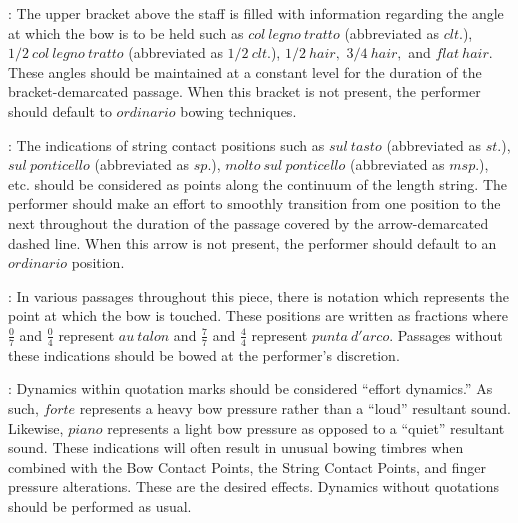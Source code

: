 \documentclass[11pt]{article}
\begin{document}
\begingroup
\begin{center}
 : The upper bracket above the staff is filled with information regarding the angle at which the bow is to be held such as $col \ legno \ tratto$ (abbreviated as $clt.$), $1/2 \ col \ legno \ tratto$ (abbreviated as $1/2 \ clt.$), $1/2 \ hair,$ $3/4 \ hair,$ and $flat \ hair.$ These angles should be maintained at a constant level for the duration of the bracket-demarcated passage. When this bracket is not present, the performer should default to $ordinario$ bowing techniques.
\rightskip\leftskip
\phantom{text} \hfill \phantom{()}

 : The indications of string contact positions such as $sul \ tasto$ (abbreviated as $st.$), $sul \ ponticello$ (abbreviated as $sp.$), $molto \ sul \ ponticello$ (abbreviated as $msp.$), etc. should be considered as points along the continuum of the length string. The performer should make an effort to smoothly transition from one position to the next throughout the duration of the passage covered by the arrow-demarcated dashed line. When this arrow is not present, the performer should default to an $ordinario$ position.
\rightskip\leftskip
\phantom{text} \hfill \phantom{()}

 : In various passages throughout this piece, there is notation which represents the point at which the bow is touched. These positions are written as fractions where \( \frac{0}{7} \) and  \( \frac{0}{4} \) represent $au \ talon$ and \( \frac{7}{7} \) and \( \frac{4}{4} \) represent $punta \ d'arco$. Passages without these indications should be bowed at the performer's discretion.
\rightskip\leftskip
\phantom{text} \hfill \phantom{()}

 : Dynamics within quotation marks should be considered ``effort dynamics.'' As such, $forte$ represents a heavy bow pressure rather than a ``loud'' resultant sound. Likewise, $piano$ represents a light bow pressure as opposed to a ``quiet'' resultant sound. These indications will often result in unusual bowing timbres when combined with the Bow Contact Points, the String Contact Points, and finger pressure alterations. These are the desired effects. Dynamics without quotations should be performed as usual.
\rightskip\leftskip
\phantom{text} \hfill \phantom{()}


\end{center}
\end{document}
